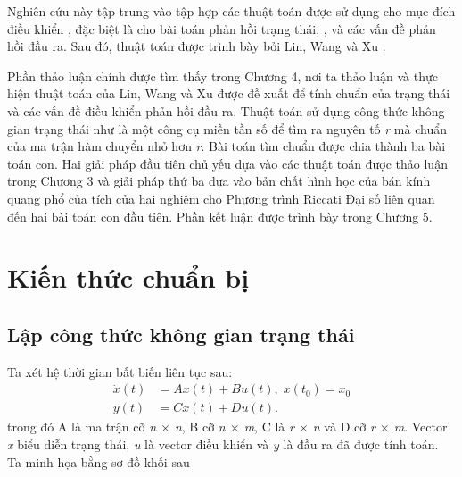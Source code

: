 \documentclass[12pt,a4paper]{article}
\theoremstyle{definition}
\newcommand{\hinf}{\text{\emph{H$_\infty$ }}}
\begin{document}
\medskip
Nghiên cứu này tập trung vào tập hợp các thuật toán được sử dụng cho mục đích điều khiển \hinf, đặc biệt là cho bài toán phản hồi trạng thái, \cite{3}, \cite{4} và các vấn đề phản hồi đầu ra. Sau đó, thuật toán được trình bày bởi Lin, Wang và Xu \cite{16}.


\medskip
Phần thảo luận chính được tìm thấy trong Chương 4, nơi ta thảo luận và thực hiện thuật toán của Lin, Wang và Xu \cite{16} được đề xuất để tính chuẩn \hinf của trạng thái và các vấn đề điều khiển phản hồi đầu ra. Thuật toán sử dụng công thức không gian trạng thái như là  một công cụ miền tần số để tìm ra nguyên tố \emph{r} mà chuẩn \hinf của ma trận hàm chuyển nhỏ hơn \emph{r}. Bài toán tìm chuẩn \hinf được chia thành ba bài toán con. Hai giải pháp đầu tiên chủ yếu dựa vào các thuật toán được thảo luận trong Chương 3 và giải pháp thứ ba dựa vào bản chất hình học của bán kính quang phổ của tích của hai nghiệm cho Phương trình Riccati Đại số liên quan đến hai bài toán con đầu tiên. Phần kết luận được trình bày trong Chương 5.


\newpage
\section{Kiến thức chuẩn bị}
\subsection{Lập công thức không gian trạng thái}
Ta xét hệ thời gian bất biến liên tục sau:
\begin{align}
    \dot{x}(t) &= Ax(t) + Bu(t), \; x(t_0) = x_0 \label{ct2.1.1} \\ 
    y(t) &= Cx(t) + Du(t).\nonumber 
\end{align}
trong đó A là ma trận cỡ \emph{n $\times$ n}, B cỡ \emph{n $\times$ m}, C là \emph{r $\times$ n} và D cỡ \emph{r $\times$ m}. Vector \emph{x} biểu diễn trạng thái, \emph{u} là vector điều khiển và \emph{y} là đầu ra đã được tính toán. Ta minh họa bằng sơ đồ khối sau 
\end{document}
